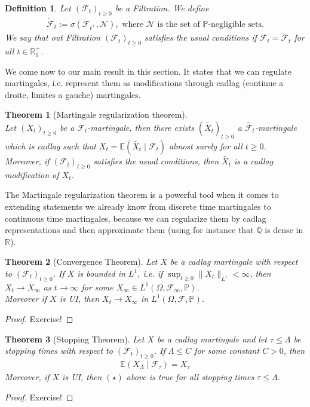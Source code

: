 \documentclass[11pt,a4paper, final]{article}
\newtheorem{thm}{Theorem}[section]
\newtheorem{defn}{Definition}[section]
\theoremstyle{definition}
\begin{document}
\begin{defn} Let $(\mathcal{F}_t)_{t \geq 0}$ be a Filtration. We define
\begin{align*}
\tilde{\mathcal{F}}_t := \sigma ( \mathcal{F}_{t^+}, \mathcal{N}), \text{ where } \mathcal{N} \text{ is the set of $\mathbb{P}$-negligible sets}. 
\end{align*}
We say that out Filtration $( \mathcal{F}_t)_{t \geq 0}$ satisfies the usual conditions if $\mathcal{F}_t = \tilde{\mathcal{F}}_t$ for all $t \in \mathbb{R}_0^+$.
\end{defn}
\noindent We come now to our main result in this section. It states that we can regulate martingales, i.e. represent them as modifications through cadlag (continue a droite, limites a gauche) martingales. 
\begin{thm}[Martingale regularization theorem] \ \\ Let $(X_t)_{t \geq 0}$ be a $ \mathcal{F}_t$-martingale, then there exists $(\widetilde{X_t})_{t \geq 0}$ a $\widetilde{\mathcal{F}_t}$-martingale which is cadlag such that $X_t = \mathbb{E}( \widetilde{X_t} \mid \mathcal{F}_t) $ almost surely for all $t \geq 0$. \\
Moreover, if $(\mathcal{F}_t)_{t \geq 0}$ satisfies the usual conditions, then $\widetilde{X_t}$ is a cadlag modification of $X_t$. 
\end{thm}
\newpage
\noindent The Martingale regularization theorem is a powerful tool when it comes to extending statements we already know from discrete time martingales to continuous time martingales, because we can regularize them by cadlag representations and then approximate them (using for instance that $\mathbb{Q}$ is dense in $\mathbb{R}$). 
\begin{thm}[Convergence Theorem] Let $X$ be a cadlag martingale with respect to $( \mathcal{F}_t)_{t \geq 0}$. If $X$ is bounded in $L^1$, i.e. if $\sup_{t \geq 0} \| X_t \|_{L^1} < \infty$, then $X_t \to X_\infty$ as $t \to \infty$ for some $X_\infty \in L^1( \Omega, \mathcal{F}_\infty, \mathbb{P})$. \\
Moreover if $X$ is UI, then $X_t \to X_\infty$ in $L^1( \Omega, \mathcal{F}, \mathbb{P})$. 
\end{thm}
\begin{proof}
Exercise!
\end{proof}
\begin{thm}[Stopping Theorem] Let $X$ be a cadlag martingale and let $\tau \leq \Lambda$ be stopping times with respect to $( \mathcal{F}_t)_{t \geq 0}$. If $\Lambda \leq C$ for some constant $C >0$, then 
\begin{align*}
\mathbb{E}(X_\Lambda \mid \mathcal{F}_\tau ) = X_\tau \tag{$\star$}
\end{align*}
Moreover, if $X$ is UI, then $(\star)$ above is true for all stopping times $\tau \leq \Lambda.$ 
\end{thm}
\begin{proof}
Exercise!
\end{proof}
\newpage
\end{document}

